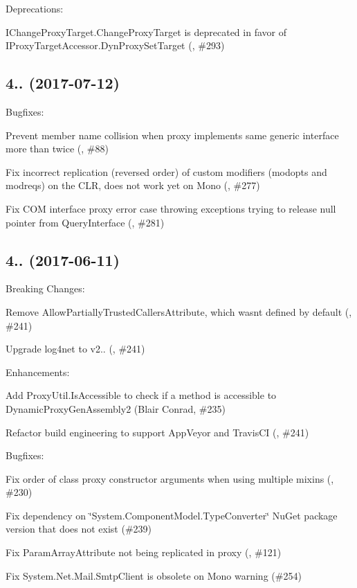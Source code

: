 Deprecations\+:
\begin{DoxyItemize}
\item I\+Change\+Proxy\+Target.\+Change\+Proxy\+Target is deprecated in favor of I\+Proxy\+Target\+Accessor.\+Dyn\+Proxy\+Set\+Target (, \#293)
\end{DoxyItemize}

\subsection*{4.. (2017-\/07-\/12)}

Bugfixes\+:
\begin{DoxyItemize}
\item Prevent member name collision when proxy implements same generic interface more than twice (, \#88)
\item Fix incorrect replication (reversed order) of custom modifiers (modopts and modreqs) on the C\+LR, does not work yet on Mono (, \#277)
\item Fix C\+OM interface proxy error case throwing exceptions trying to release null pointer from Query\+Interface (, \#281)
\end{DoxyItemize}

\subsection*{4.. (2017-\/06-\/11)}

Breaking Changes\+:
\begin{DoxyItemize}
\item Remove Allow\+Partially\+Trusted\+Callers\+Attribute, which wasn\textquotesingle{}t defined by default (, \#241)
\item Upgrade log4net to v2.. (, \#241)
\end{DoxyItemize}

Enhancements\+:
\begin{DoxyItemize}
\item Add Proxy\+Util.\+Is\+Accessible to check if a method is accessible to Dynamic\+Proxy\+Gen\+Assembly2 (Blair Conrad, \#235)
\item Refactor build engineering to support App\+Veyor and Travis\+CI (, \#241)
\end{DoxyItemize}

Bugfixes\+:
\begin{DoxyItemize}
\item Fix order of class proxy constructor arguments when using multiple mixins (, \#230)
\item Fix dependency on \char`\"{}\+System.\+Component\+Model.\+Type\+Converter\char`\"{} Nu\+Get package version that does not exist (\#239)
\item Fix Param\+Array\+Attribute not being replicated in proxy (, \#121)
\item Fix System.\+Net.\+Mail.\+Smtp\+Client is obsolete on Mono warning (\#254)
\end{DoxyItemize}

